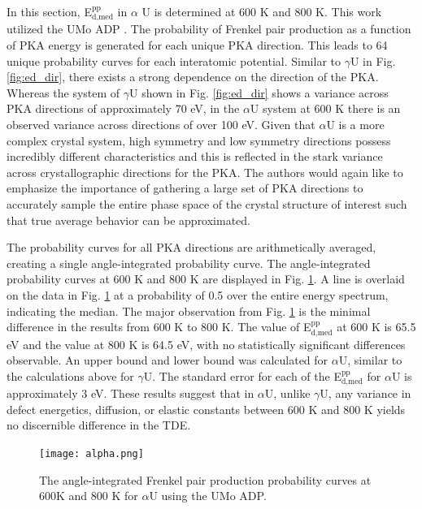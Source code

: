 \documentclass[review]{elsarticle}
\begin{document}
In this section, E$^{\textrm{pp}}_{\textrm{d,med}}$ in $\alpha$ U is determined at 600 K and 800 K. This work utilized the UMo ADP \cite{smirnovaADP}. The probability of Frenkel pair production as a function of PKA energy is generated for each unique PKA direction. This leads to 64 unique probability curves for each interatomic potential. Similar to $\gamma$U in Fig. \ref{fig:ed_dir}, there exists a strong dependence on the direction of the PKA. Whereas the system of $\gamma$U shown in Fig. \ref{fig:ed_dir} shows a variance across PKA directions of approximately 70 eV, in the $\alpha$U system at 600 K there is an observed variance across directions of over 100 eV. Given that $\alpha$U is a more complex crystal system, high symmetry and low symmetry directions possess incredibly different characteristics and this is reflected in the stark variance across crystallographic directions for the PKA. The authors would again like to emphasize the importance of gathering a large set of PKA directions to accurately sample the entire phase space of the crystal structure of interest such that true average behavior can be approximated. 

The probability curves for all PKA directions are arithmetically averaged, creating a single angle-integrated probability curve. The angle-integrated probability curves at 600 K and 800 K are displayed in Fig. \ref{fig:alpha}. A line is overlaid on the data in Fig. \ref{fig:alpha} at a probability of 0.5 over the entire energy spectrum, indicating the median. The major observation from Fig. \ref{fig:alpha} is the minimal difference in the results from 600 K to 800 K. The value of E$^{\textrm{pp}}_{\textrm{d,med}}$ at 600 K is 65.5 eV and the value at 800 K is 64.5 eV, with no statistically significant differences observable. An upper bound and lower bound was calculated for $\alpha$U, similar to the calculations above for $\gamma$U. The standard error for each of the E$^{\textrm{pp}}_{\textrm{d,med}}$ for $\alpha$U is approximately 3 eV. These results suggest that in $\alpha$U, unlike $\gamma$U, any variance in defect energetics, diffusion, or elastic constants between 600 K and 800 K yields no discernible difference in the TDE.

\begin{figure}[h]
 \centering
 \texttt{[image: alpha.png]} 
 \caption{The angle-integrated Frenkel pair production probability curves at 600K and 800 K for $\alpha$U using the UMo ADP.}
 \label{fig:alpha}
\end{figure}
\end{document}
